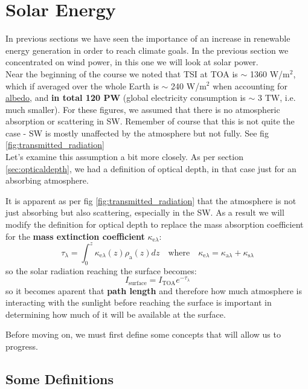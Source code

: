 \section{Solar Energy}
\label{sec:SolarEnergy}

In previous sections we have seen the importance of an increase in renewable 
energy generation in order to reach climate goals. In the previous section we 
concentrated on wind power, in this one we will look at solar power. \\

Near the beginning of the course we noted that \gls{TSI} at \gls{TOA} is 
$\sim$ 1360 W/m$^2$, which if averaged over the whole Earth is $\sim$ 240 W/m$^2$
when accounting for \hyperlink{glo:albedo}{albedo}, and \textbf{in total 120 PW}
(global electricity consumption is $\sim$ 3 TW, i.e. much smaller). For these
figures, we assumed that there is no atmospheric absorption or scattering in
\gls{SW}. Remember of course that this is not quite the case - \gls{SW} is mostly
unaffected by the atmosphere but not fully. See fig \ref{fig:transmitted_radiation} \\

Let's examine this assumption a bit more closely. As per section \ref{sec:opticaldepth},
we had a definition of optical depth, in that case just for an absorbing atmosphere.

It is apparent as per fig \ref{fig:transmitted_radiation} that the atmosphere is
not just absorbing but also scattering, especially in the \gls{SW}. As a result we
will modify the definition for optical depth to replace the mass absorption 
coefficient for the \textbf{mass extinction coefficient} $\kappa_{\text{e}\lambda}$:
$$
\boxed{
    \tau_\lambda = \int_0^z \kappa_{\text{e}\lambda}(z) \rho_\text{a}(z) dz
}
\quad \text{where} \quad \kappa_{\text{e}\lambda} = \kappa_{\text{a}\lambda} + 
\kappa_{\text{s}\lambda}
$$
so the solar radiation reaching the surface becomes:
$$
I_{\text{surface}} = I_{\text{TOA}} e^{-\tau_\lambda} 
$$
so it becomes aparent that \textbf{path length} and therefore how much atmosphere
is interacting with the sunlight before reaching the surface is important in 
determining how much of it will be available at the surface. 

\noindent Before moving on, we must first define some concepts that will allow
us to progress. \\


\subsection{Some Definitions}
\label{sec:solar_definitions}

